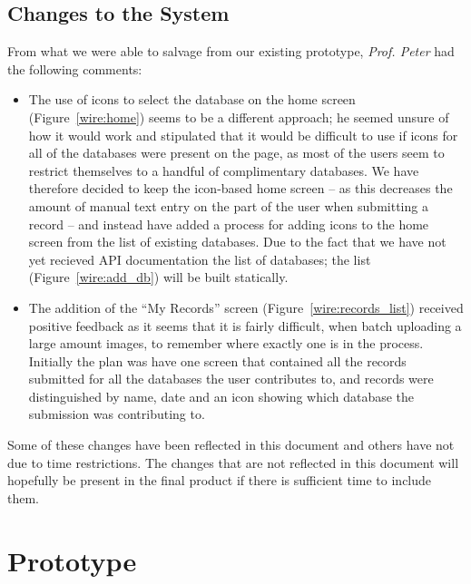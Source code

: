 \documentclass[
10pt, %
a4paper, %
oneside, %
headinclude,footinclude, %
BCOR5mm, %
]{scrartcl}
\begin{document}

\subsection{Changes to the System} %
\label{sub:changes_to_the_system}

From what we were able to salvage from our existing prototype, \textit{Prof. Peter} had the following comments:

\begin{itemize}
\item The use of icons to select the database on the home screen (Figure~\vref{wire:home}) seems to be a different approach; he seemed unsure of how it would work and stipulated that it would be difficult to use if icons for all of the databases were present on the page, as most of the users seem to restrict themselves to a handful of complimentary databases. We have therefore decided to keep the icon-based home screen -- as this decreases the amount of manual text entry on the part of the user when submitting a record -- and instead have added a process for adding icons to the home screen from the list of existing databases. Due to the fact that we have not yet recieved API documentation the list of databases; the list (Figure~\vref{wire:add_db}) will be built statically.
\item The addition of the ``My Records'' screen (Figure~\vref{wire:records_list}) received positive feedback as it seems that it is fairly difficult, when batch uploading a large amount images, to remember where exactly one is in the process. Initially the plan was have one screen that contained all the records submitted for all the databases the user contributes to, and records were distinguished by name, date and an icon showing which database the submission was contributing to.
\end{itemize}

Some of these changes have been reflected in this document and others have not due to time restrictions. The changes that are not reflected in this document will hopefully be present in the final product if there is sufficient time to include them.



\section{Prototype} %
\label{sec:prototype}
\end{document}
